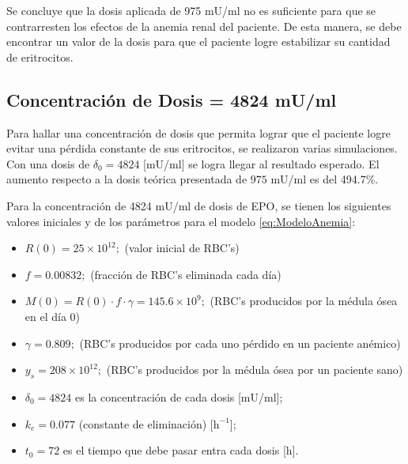 Se concluye que la dosis aplicada de 975 mU/ml no es suficiente para que se contrarresten los efectos de la anemia renal del paciente. De esta manera, se debe encontrar un valor de la dosis para que el paciente logre estabilizar su cantidad de eritrocitos.

\subsection{Concentración de Dosis = 4824 mU/ml}\label{subsec:variaciones:anemia:bien}

Para hallar una concentración de dosis que permita lograr que el paciente logre evitar una pérdida constante de sus eritrocitos, se realizaron varias simulaciones. Con una dosis de $\delta_0 = 4824$ [mU/ml] se logra llegar al resultado esperado. El aumento respecto a la dosis teórica presentada de $975$ mU/ml es del 494.7$\%$. 

Para la concentración de 4824 mU/ml de dosis de EPO, se tienen los siguientes valores iniciales y de los parámetros para el modelo \ref{eq:ModeloAnemia}:

\begin{itemize}
    \item $R(0) = 25\times 10^{12};$ (valor inicial de RBC's)
    \item $f=0.00832;$ (fracción de RBC's eliminada cada día)
    \item $M(0) = R(0)\cdot f \cdot \gamma = 145.6\times 10^{9};$ (RBC's producidos por la médula ósea en el día 0)
    \item $\gamma = 0.809;$ (RBC's producidos por cada uno pérdido en un paciente anémico) 
    \item $y_s = 208\times 10^{12};$ (RBC's producidos por la médula ósea por un paciente sano)
    \item $\delta_0=4824$ es la concentración de cada dosis [mU/ml];
    \item $k_e=0.077$ (constante de eliminación) [$\textrm{h}^{-1}$];
    \item $t_0=72$ es el tiempo que debe pasar entra cada dosis [h].
\end{itemize}

